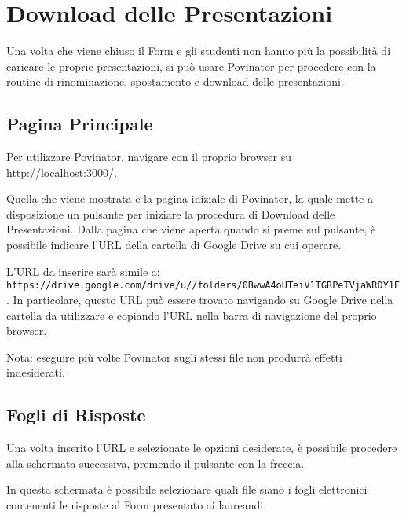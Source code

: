 \documentclass[12pt]{report}
\begin{document}
\section{Download delle Presentazioni}\label{download-delle-presentazioni}

Una volta che viene chiuso il Form e gli studenti non hanno più la possibilità di caricare le proprie presentazioni, si può usare Povinator per procedere con la routine di rinominazione, spostamento e download delle presentazioni.

\subsection{Pagina Principale}\label{pagina-principale}

Per utilizzare Povinator, navigare con il proprio browser su \url{http://localhost:3000/}.

Quella che viene mostrata è la pagina iniziale di Povinator, la quale mette a disposizione un pulsante per iniziare la procedura di Download delle Presentazioni.
Dalla pagina che viene aperta quando si preme sul pulsante, è possibile indicare l'URL della cartella di Google Drive su cui operare.

L'URL da inserire sarà simile a:
\texttt{https://drive.google.com/drive/u//folders/0BwwA4oUTeiV1TGRPeTVjaWRDY1E}.
In particolare, questo URL può essere trovato navigando su Google Drive nella cartella da utilizzare e copiando l'URL nella barra di navigazione del proprio browser.


Nota: eseguire più volte Povinator sugli stessi file non produrrà effetti indesiderati.

\subsection{Fogli di Risposte}\label{fogli-di-risposte}

Una volta inserito l'URL e selezionate le opzioni desiderate, è possibile procedere alla schermata successiva, premendo il pulsante con la freccia.

In questa schermata è possibile selezionare quali file siano i fogli elettronici contenenti le risposte al Form presentato ai laureandi.
\end{document}
